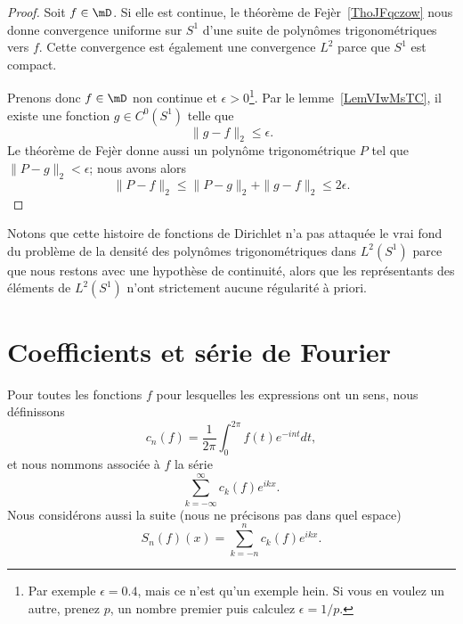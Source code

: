 \begin{proof}
    Soit \( f\in\mD\). Si elle est continue, le théorème de Fejèr~\ref{ThoJFqczow} nous donne convergence uniforme sur \( S^1\) d'une suite de polynômes trigonométriques vers \( f\). Cette convergence est également une convergence \( L^2\) parce que \( S^1\) est compact.

    Prenons donc \( f\in \mD\) non continue et \( \epsilon>0\)\footnote{Par exemple \( \epsilon=0.4\), mais ce n'est qu'un exemple hein. Si vous en voulez un autre, prenez \( p\), un nombre premier puis calculez \( \epsilon=1/p\).}. Par le lemme~\ref{LemVIwMsTC}, il existe une fonction \( g\in C^0(S^1)\) telle que
    \begin{equation}
        \| g-f \|_2\leq \epsilon.
    \end{equation}
    Le théorème de Fejèr donne aussi un polynôme trigonométrique \( P\) tel que \( \| P-g \|_2<\epsilon\); nous avons alors
    \begin{equation}
        \| P-f \|_2\leq \| P-g \|_{2}+\| g-f \|_2\leq 2\epsilon.
    \end{equation}
\end{proof}

Notons que cette histoire de fonctions de Dirichlet n'a pas attaquée le vrai fond du problème de la densité des polynômes trigonométriques dans \(  L^2(S^1)\) parce que nous restons avec une hypothèse de continuité, alors que les représentants des éléments de \( L^2(S^1)\) n'ont strictement aucune régularité à priori.

\section{Coefficients et série de Fourier}

\begin{definition}      \label{DEFooJUUIooNMdCtN}
    Pour toutes les fonctions \( f\) pour lesquelles les expressions ont un sens, nous définissons
    \begin{equation}    \label{EqNDBaXRL}
        c_n(f)=\frac{1}{ 2\pi }\int_0^{2\pi}f(t) e^{-int}dt,
    \end{equation}
    et nous nommons  associée à \( f\) la série
    \begin{equation}
        \sum_{k=-\infty}^{\infty}c_k(f) e^{ikx}.
    \end{equation}
    Nous considérons aussi la suite (nous ne précisons pas dans quel espace)
    \begin{equation}
        S_n(f)(x)=\sum_{k=-n}^nc_k(f) e^{ikx}.
    \end{equation}
\end{definition}

